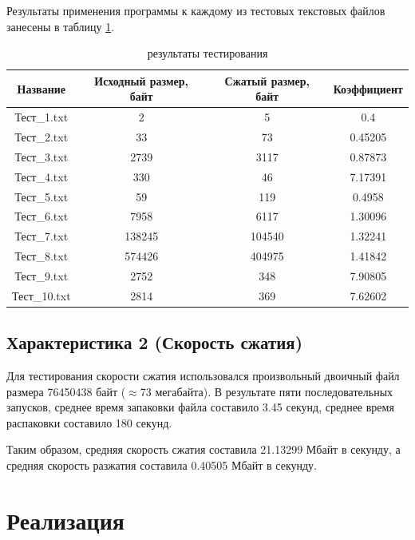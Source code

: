 \documentclass[a4paper,oneside]{article}
\theoremstyle{definition}
\begin{document}
Результаты применения программы к каждому из тестовых текстовых файлов занесены
в таблицу \ref{tbl:results}.

\begin{table}[H]
  \small
  \centering
  \begin{tabular}{|c|c|c|c|}
    \hline
    Название     & Исходный размер, байт & Сжатый размер, байт & Коэффициент \\ \hline \hline
    Тест\_1.txt  & 2           &      5  & 0.4     \\ \hline
    Тест\_2.txt  & 33          &     73  & 0.45205 \\ \hline
    Тест\_3.txt  & 2739        &   3117  & 0.87873 \\ \hline
    Тест\_4.txt  & 330         &     46  & 7.17391 \\ \hline
    Тест\_5.txt  & 59          &    119  & 0.4958  \\ \hline
    Тест\_6.txt  & 7958        &   6117  & 1.30096 \\ \hline
    Тест\_7.txt  & 138245      & 104540  & 1.32241 \\ \hline
    Тест\_8.txt  & 574426      & 404975  & 1.41842 \\ \hline
    Тест\_9.txt  & 2752        &    348  & 7.90805 \\ \hline
    Тест\_10.txt & 2814        &    369  & 7.62602 \\ \hline
  \end{tabular}
  \caption{результаты тестирования}
  \label{tbl:results}
\end{table}

\subsection{Характеристика 2 (Скорость сжатия)}

Для тестирования скорости сжатия использовался произвольный двоичный
файл размера 76450438 байт ($\approx$73 мегабайта). В результате пяти
последовательных запусков, среднее время запаковки файла составило 3.45
секунд, среднее время распаковки составило 180 секунд.

Таким образом, средняя скорость сжатия составила 21.13299 Мбайт в секунду, а
средняя скорость разжатия составила 0.40505 Мбайт в секунду.


\section{Реализация}
\end{document}
